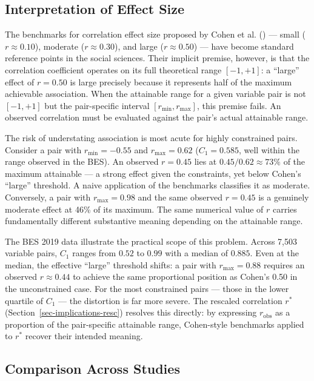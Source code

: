 \documentclass[
  12pt,
]{article}
\theoremstyle{plain}
\theoremstyle{definition}
\theoremstyle{remark}
\begin{document}
\subsection{Interpretation of Effect
Size}\label{interpretation-of-effect-size}

The benchmarks for correlation effect size proposed by Cohen et al.
() --- small (\(r \approx 0.10\)),
moderate (\(r \approx 0.30\)), and large (\(r \approx 0.50\)) --- have
become standard reference points in the social sciences. Their implicit
premise, however, is that the correlation coefficient operates on its
full theoretical range \([-1, +1]\): a ``large'' effect of \(r = 0.50\)
is large precisely because it represents half of the maximum achievable
association. When the attainable range for a given variable pair is not
\([-1, +1]\) but the pair-specific interval \([r_{\min}, r_{\max}]\),
this premise fails. An observed correlation must be evaluated against
the pair's actual attainable range.

The risk of understating association is most acute for highly
constrained pairs. Consider a pair with \(r_{\min} = -0.55\) and
\(r_{\max} = 0.62\) (\(C_1 = 0.585\), well within the range observed in
the BES). An observed \(r = 0.45\) lies at \(0.45/0.62 \approx 73\%\) of
the maximum attainable --- a strong effect given the constraints, yet
below Cohen's ``large'' threshold. A naive application of the benchmarks
classifies it as moderate. Conversely, a pair with \(r_{\max} = 0.98\)
and the same observed \(r = 0.45\) is a genuinely moderate effect at
46\% of its maximum. The same numerical value of \(r\) carries
fundamentally different substantive meaning depending on the attainable
range.

The BES 2019 data illustrate the practical scope of this problem. Across
7,503 variable pairs, \(C_1\) ranges from \(0.52\) to \(0.99\) with a
median of \(0.885\). Even at the median, the effective ``large''
threshold shifts: a pair with \(r_{\max} = 0.88\) requires an observed
\(r \approx 0.44\) to achieve the same proportional position as Cohen's
0.50 in the unconstrained case. For the most constrained pairs --- those
in the lower quartile of \(C_1\) --- the distortion is far more severe.
The rescaled correlation \(r^*\) (Section~\ref{sec-implications-resc})
resolves this directly: by expressing \(r_{\text{obs}}\) as a proportion
of the pair-specific attainable range, Cohen-style benchmarks applied to
\(r^*\) recover their intended meaning.

\subsection{Comparison Across Studies}\label{comparison-across-studies}
\end{document}

